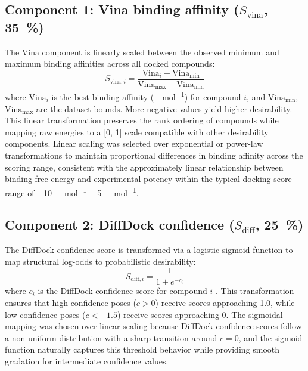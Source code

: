 \documentclass[journal=jcisd8,manuscript=suppinfo]{achemso}
\begin{document}
\subsection*{Component 1: Vina binding affinity ($S_{\text{vina}}$, \qty{35}{\percent})}

The Vina component is linearly scaled between the observed minimum and maximum binding affinities across all docked compounds:
\begin{equation}
S_{\text{vina}, i} = \frac{\text{Vina}_i - \text{Vina}_{\min}}{\text{Vina}_{\max} - \text{Vina}_{\min}}
\label{eq:vina}
\end{equation}
where $\text{Vina}_i$ is the best binding affinity (\unit{\kilo\calorie\per\mole}) for compound $i$, and $\text{Vina}_{\min}$, $\text{Vina}_{\max}$ are the dataset bounds. More negative values yield higher desirability. This linear transformation preserves the rank ordering of compounds while mapping raw energies to a [\num{0}, \num{1}] scale compatible with other desirability components. Linear scaling was selected over exponential or power-law transformations to maintain proportional differences in binding affinity across the scoring range, consistent with the approximately linear relationship between binding free energy and experimental potency within the typical docking score range of \qtyrange{-10}{-5}{\kilo\calorie\per\mole}.

\subsection*{Component 2: DiffDock confidence ($S_{\text{diff}}$, \qty{25}{\percent})}

The DiffDock confidence score is transformed via a logistic sigmoid function to map structural log-odds to probabilistic desirability:
\begin{equation}
S_{\text{diff}, i} = \frac{1}{1 + e^{-c_i}}
\label{eq:diffdock}
\end{equation}
where $c_i$ is the DiffDock confidence score for compound $i$ \cite{Corso2023}. This transformation ensures that high-confidence poses ($c > \num{0}$) receive scores approaching \num{1.0}, while low-confidence poses ($c < \num{-1.5}$) receive scores approaching \num{0}. The sigmoidal mapping was chosen over linear scaling because DiffDock confidence scores follow a non-uniform distribution with a sharp transition around $c = \num{0}$, and the sigmoid function naturally captures this threshold behavior while providing smooth gradation for intermediate confidence values.
\end{document}
